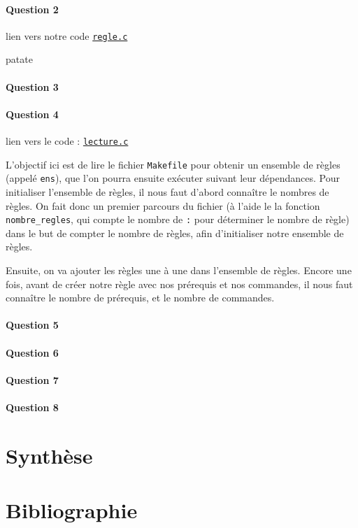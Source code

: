 \documentclass{article}
\begin{document}
\paragraph{Question 2}

lien vers notre code \texttt{\href{https://github.com/LostExcalibur/mymake/blob/master/regle.c}{regle.c}}

patate

\paragraph{Question 3}

\paragraph{Question 4}

lien vers le code : \texttt{\href{https://github.com/LostExcalibur/mymake/blob/master/lecture.c}{lecture.c}}

L’objectif ici est de lire le fichier \texttt{Makefile} pour obtenir un ensemble de règles (appelé \texttt{ens}), que l’on pourra ensuite exécuter suivant leur dépendances. Pour initialiser l’ensemble de règles, il nous faut d’abord connaître le nombres de règles. On fait donc un premier parcours du fichier (à l’aide le la fonction \texttt{nombre\_regles}, qui compte le nombre de \texttt{:} pour déterminer le nombre de règle) dans le but de compter le nombre de règles, afin d’initialiser notre ensemble de règles.

Ensuite, on va ajouter les règles une à une dans l’ensemble de règles. Encore une fois, avant de créer notre règle avec nos prérequis et nos commandes, il nous faut connaître le nombre de prérequis, et le nombre de commandes. 

\paragraph{Question 5}

\paragraph{Question 6}

\paragraph{Question 7}

\paragraph{Question 8}

\section{Synthèse}

\section{Bibliographie}
\end{document}
